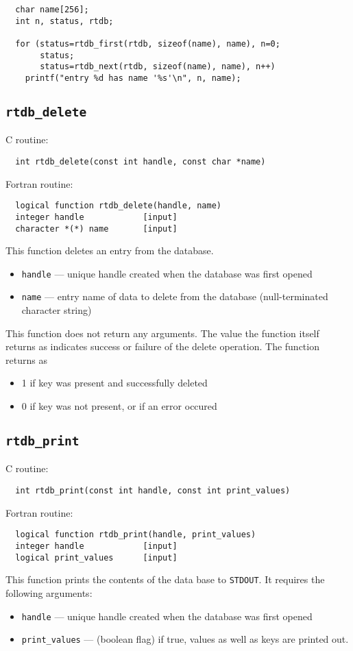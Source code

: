 \begin{verbatim}
  char name[256];
  int n, status, rtdb;

  for (status=rtdb_first(rtdb, sizeof(name), name), n=0;
       status;
       status=rtdb_next(rtdb, sizeof(name), name), n++) 
    printf("entry %d has name '%s'\n", n, name);
\end{verbatim}

\subsection{{\tt rtdb\_delete}}

C routine:

\begin{verbatim}
  int rtdb_delete(const int handle, const char *name)
\end{verbatim}


Fortran routine:

\begin{verbatim}
  logical function rtdb_delete(handle, name)
  integer handle            [input]
  character *(*) name       [input]
\end{verbatim}
This function deletes an entry from the database. 
\begin{itemize}
\item {\tt handle} --- unique handle created when the database was first opened
\item {\tt name} --- entry name of data to delete from the database (null-terminated character string)
\end{itemize}
This function does not return any arguments.  The value the function itself returns as indicates
success or failure of the delete operation.  The function returns as
\begin{itemize}
\item 1 if key was present and successfully deleted
\item 0 if key was not present, or if an error occured
\end{itemize}

\subsection{{\tt rtdb\_print}}

C routine:

\begin{verbatim}
  int rtdb_print(const int handle, const int print_values)
\end{verbatim}


Fortran routine:

\begin{verbatim}
  logical function rtdb_print(handle, print_values)
  integer handle            [input]
  logical print_values      [input]
\end{verbatim}
This function prints the contents of the data base to {\tt STDOUT}.  It requires
the following arguments:
\begin{itemize}
\item {\tt handle} --- unique handle created when the database was first opened
\item {\tt print\_values} --- (boolean flag) if true, values as
  well as keys are printed out.
\end{itemize}
